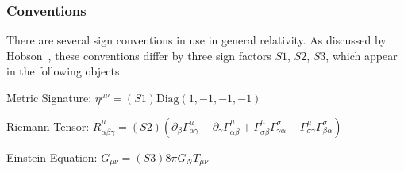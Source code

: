 \subsubsection{Conventions}
\label{app:conventions}
There are several sign conventions in use in general relativity. As discussed by Hobson~\cite{hobson}, these conventions differ by three sign factors $S1$, $S2$, $S3$, which appear in the following objects:
\vspace{3mm}

Metric Signature: $\eta^{\mu\nu}=(S1)\text{Diag}(1,-1,-1,-1)$
\vspace{3mm}

Riemann Tensor: $R^\mu_{\alpha\beta\gamma}=(S2)(\partial_{\beta}\Gamma^\mu_{\alpha\gamma}-\partial_{\gamma}\Gamma^\mu_{\alpha\beta}+\Gamma^\mu_{\sigma\beta}\Gamma^\sigma_{\gamma\alpha}-\Gamma^\mu_{\sigma\gamma}\Gamma^\sigma_{\beta\alpha})$
\vspace{3mm}

Einstein Equation: $G_{\mu\nu}=(S3)8\pi G_NT_{\mu\nu}$
\vspace{3mm}

